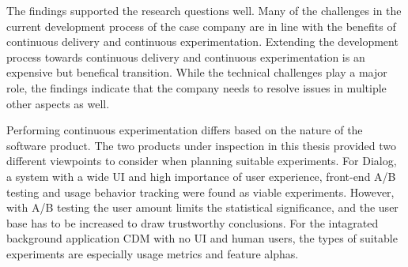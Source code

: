 \documentclass[english]{tktltiki2}
\theoremstyle{definition}
\theoremstyle{remark}
\begin{document}
The findings supported the research questions well. Many of the challenges in the current development process of the case company are in line with the benefits of continuous delivery and continuous experimentation. Extending the development process towards continuous delivery and continuous experimentation is an expensive but benefical transition. While the technical challenges play a major role, the findings indicate that the company needs to resolve issues in multiple other aspects as well. 



Performing continuous experimentation differs based on the nature of the software product. The two products under inspection in this thesis provided two different viewpoints to consider when planning suitable experiments. For Dialog, a system with a wide UI and high importance of user experience, front-end A/B testing and usage behavior tracking were found as viable experiments. However, with A/B testing the user amount limits the statistical significance, and the user base has to be increased to draw trustworthy conclusions. For the intagrated background application CDM with no UI and human users, the types of suitable experiments are especially usage metrics and feature alphas. %



















\end{document}
